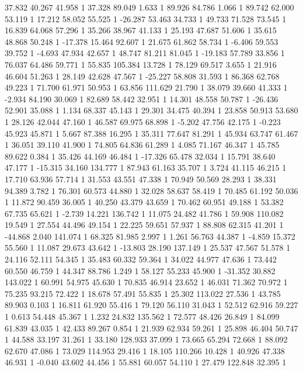 	37.832 40.267 41.958 1
	37.328 89.049 1.633 1
	89.926 84.786 1.066 1
	89.742 62.000 53.119 1
	17.212 58.052 55.525 1
	-26.287 53.463 34.733 1
	49.733 71.528 73.545 1
	16.839 64.068 57.296 1
	35.266 38.967 41.133 1
	25.193 47.687 51.606 1
	35.615 48.868 50.248 1
	-17.378 15.464 92.607 1
	21.675 61.862 58.734 1
	-6.406 59.553 39.752 1
	-4.693 47.934 42.657 1
	48.747 81.211 81.045 1
	-19.183 57.789 33.856 1
	76.037 64.486 59.771 1
	55.835 105.384 13.728 1
	78.129 69.517 3.655 1
	21.916 46.604 51.263 1
	28.149 42.628 47.567 1
	-25.227 58.808 31.593 1
	86.368 62.768 49.223 1
	71.700 61.971 50.953 1
	63.856 111.629 21.790 1
	38.079 39.660 41.333 1
	-2.934 84.190 30.069 1
	82.689 58.442 32.951 1
	14.301 48.558 50.787 1
	-26.436 52.901 35.088 1
	1.134 68.337 45.143 1
	29.301 34.475 40.394 1
	23.858 50.913 53.680 1
	28.126 42.044 47.160 1
	46.587 69.975 68.898 1
	-5.202 47.756 42.175 1
	-0.223 45.923 45.871 1
	5.667 87.388 16.295 1
	35.311 77.647 81.291 1
	45.934 63.747 61.467 1
	36.051 39.110 41.900 1
	74.805 64.836 61.289 1
	4.085 71.167 46.347 1
	45.785 89.622 0.384 1
	35.426 44.169 46.484 1
	-17.326 65.478 32.034 1
	15.791 38.640 47.177 1
	-15.315 34.160 134.777 1
	87.943 61.163 35.707 1
	3.724 41.115 46.215 1
	17.710 63.936 57.714 1
	31.553 43.551 47.338 1
	70.949 50.569 28.293 1
	38.331 94.389 3.782 1
	76.301 60.573 44.880 1
	32.028 58.637 58.419 1
	70.485 61.192 50.036 1
	11.872 90.459 36.005 1
	40.250 43.379 43.659 1
	70.462 60.951 49.188 1
	53.382 67.735 65.621 1
	-2.739 14.221 136.742 1
	11.075 24.482 41.786 1
	59.908 110.082 19.549 1
	27.554 44.496 49.154 1
	22.225 59.651 57.937 1
	88.808 62.315 41.201 1
	-44.868 2.040 141.074 1
	68.325 81.985 2.997 1
	1.261 56.763 44.387 1
	-4.859 15.372 55.560 1
	11.087 29.673 43.642 1
	-13.803 28.190 137.149 1
	25.537 47.567 51.578 1
	24.116 52.111 54.345 1
	35.483 60.332 59.364 1
	34.022 44.977 47.636 1
	73.442 60.550 46.759 1
	44.347 88.786 1.249 1
	58.127 55.233 45.900 1
	-31.352 30.882 143.022 1
	60.991 54.975 45.630 1
	70.835 46.914 23.652 1
	46.031 71.362 70.972 1
	75.235 93.215 72.422 1
	18.678 57.491 55.835 1
	25.302 113.022 27.536 1
	43.785 89.903 0.103 1
	16.811 61.920 55.416 1
	79.120 56.110 31.043 1
	52.512 62.916 59.227 1
	0.613 54.448 45.367 1
	1.232 24.832 135.562 1
	72.577 48.426 26.849 1
	84.099 61.839 43.035 1
	42.433 89.267 0.854 1
	21.939 62.934 59.261 1
	25.898 46.404 50.747 1
	44.588 33.197 31.261 1
	33.180 128.933 37.099 1
	73.665 65.294 72.668 1
	88.092 62.670 47.086 1
	73.029 114.953 29.416 1
	18.105 110.266 10.428 1
	40.926 47.338 46.931 1
	-0.040 43.602 44.456 1
	55.881 60.057 54.110 1
	27.479 122.848 32.395 1
